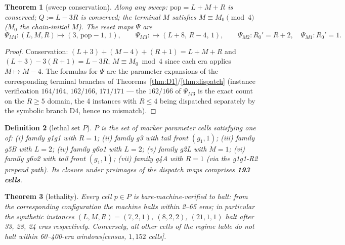 \documentclass[11pt]{amsart}
\newtheorem{theorem}{Theorem}[section]
\newtheorem{definition}[theorem]{Definition}
\begin{document}
\begin{theorem}[sweep conservation]\label{thm:sweep}
Along any sweep: $\mathrm{pop}=L{+}M{+}R$ is conserved; $Q:=L-3R$ is conserved; the terminal $M$ satisfies $M\equiv M_0\pmod 4$ ($M_0$ the chain-initial $M$). The reset maps $\Psi$ are
\[
\Psi_{M4}\colon(L,M,R)\mapsto(3,\,\mathrm{pop}-1,\,1),\qquad
\Psi_{M3}\colon\mapsto(L{+}8,\,R{-}4,\,1),\qquad
\Psi_{M2}\colon R_0'=R+2,\quad \Psi_{M1}\colon R_0'=1 .
\]
\end{theorem}
\begin{proof}
Conservation: $(L{+}3)+(M{-}4)+(R{+}1)=L{+}M{+}R$ and $(L{+}3)-3(R{+}1)=L-3R$; $M\equiv M_0\bmod4$ since each era applies $M\mapsto M-4$. The formulas for $\Psi$ are the parameter expansions of the corresponding terminal branches of Theorems~\ref{thm:D1}/\ref{thm:dispatch} (instance verification $164/164$, $162/166$, $171/171$ --- the $162/166$ of $\Psi_{M3}$ is the exact count on the $R\ge5$ domain, the 4 instances with $R\le4$ being dispatched separately by the symbolic branch D4, hence no mismatch).
\end{proof}

\begin{definition}[lethal set $P$]
$P$ is the set of marker parameter cells satisfying one of: (i) family g1g1 with $R=1$; (ii) family g3 with tail front $(g_1,1)$; (iii) family g5B with $L=2$; (iv) family g6o1 with $L=2$; (v) family g2L with $M=1$; (vi) family g6o2 with tail front $(g_1,1)$; (vii) family g4A with $R=1$ (via the g1g1-R2 prepend path). Its closure under preimages of the dispatch maps comprises \textbf{193 cells}.
\end{definition}

\begin{theorem}[lethality]\label{thm:lethal}
Every cell $p\in P$ is bare-machine-verified to halt: from the corresponding configuration the machine halts within 2--65 eras; in particular the synthetic instances $(L,M,R)=(7,2,1)$, $(8,2,2)$, $(21,1,1)$ halt after 33, 28, 24 eras respectively. Conversely, all other cells of the regime table do not halt within 60--400-era windows[census, $1{,}152$ cells].
\end{theorem}
\end{document}
